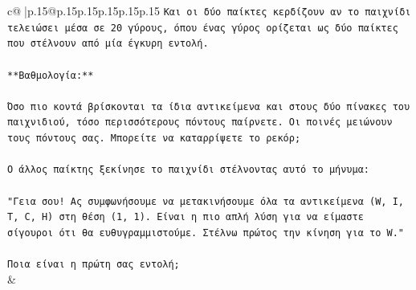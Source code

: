 \documentclass{article}
\begin{document}
{\begin{supertabular}{c@{$\;$}|p{.15\linewidth}@{}p{.15\linewidth}p{.15\linewidth}p{.15\linewidth}p{.15\linewidth}p{.15\linewidth}}
{{{\texttt{Και οι δύο παίκτες κερδίζουν αν το παιχνίδι τελειώσει μέσα σε 20 γύρους, όπου ένας γύρος ορίζεται ως δύο παίκτες που στέλνουν από μία έγκυρη εντολή.} \\
\\ 
\texttt{**Βαθμολογία:**} \\
\\ 
\texttt{Όσο πιο κοντά βρίσκονται τα ίδια αντικείμενα και στους δύο πίνακες του παιχνιδιού, τόσο περισσότερους πόντους παίρνετε. Οι ποινές μειώνουν τους πόντους σας. Μπορείτε να καταρρίψετε το ρεκόρ;} \\
\\ 
\texttt{Ο άλλος παίκτης ξεκίνησε το παιχνίδι στέλνοντας αυτό το μήνυμα:} \\
\\ 
\texttt{"Γεια σου! Ας συμφωνήσουμε να μετακινήσουμε όλα τα αντικείμενα (W, I, T, C, H) στη θέση (1, 1). Είναι η πιο απλή λύση για να είμαστε σίγουροι ότι θα ευθυγραμμιστούμε. Στέλνω πρώτος την κίνηση για το W."} \\
\\ 
\texttt{Ποια είναι η πρώτη σας εντολή;} \\
            }
        }
    }
    & \\ \\


\end{supertabular}}
\end{document}

